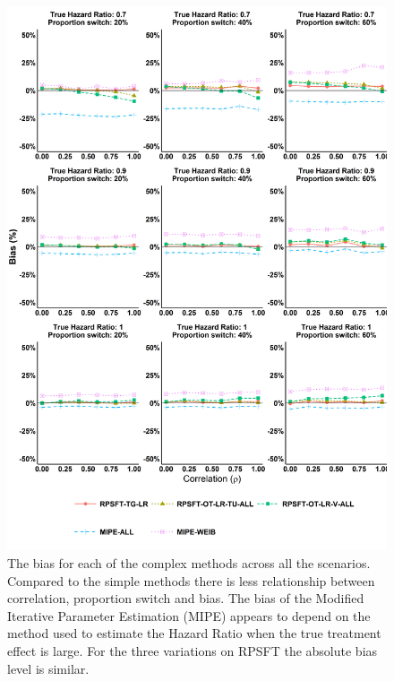 \begin{figure}[ht]
\centering
\includegraphics[width=13cm]{images/chap_sim2/complex_bias.png}
\caption{\label{F:chap_sim2:comp_bias} The bias for each of the complex methods across all the scenarios. Compared to the simple methods there is less relationship between correlation, proportion switch and bias. The bias of the Modified Iterative Parameter Estimation (MIPE) appears to depend on the method used to estimate the Hazard Ratio when the true treatment effect is large. For the three variations on RPSFT the absolute bias level is similar.} 
\end{figure}

